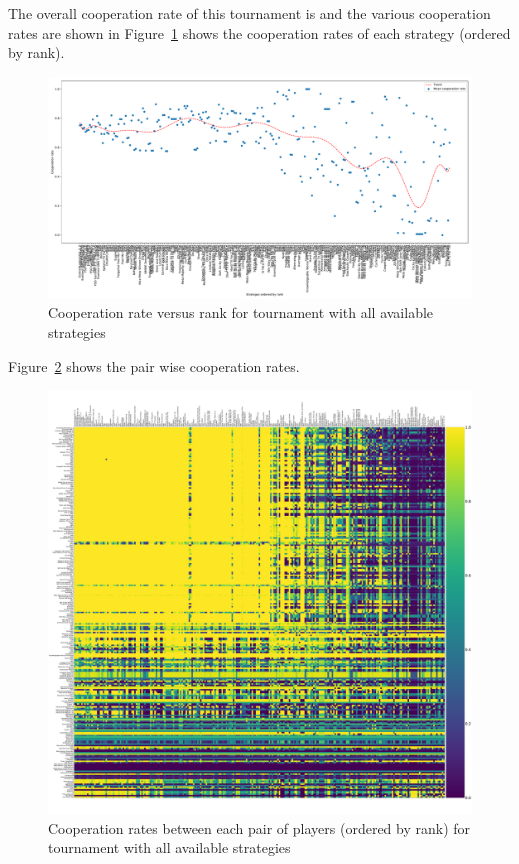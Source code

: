 \documentclass{article}
\begin{document}
The overall cooperation rate of this tournament is
and the various
cooperation rates are shown in
Figure~\ref{fig:full_tournament_cooperation_rate_versus_rank} shows the
cooperation rates of each strategy (ordered by rank).

\begin{figure}[!hbtp]
    \centering
    \includegraphics[width=.8\textwidth]{assets/full_tournament_cooperation_rate_versus_rank.pdf}
    \caption{Cooperation rate versus rank for tournament with all available
    strategies}
    \label{fig:full_tournament_cooperation_rate_versus_rank}
\end{figure}


Figure~\ref{fig:full_tournament_cooperation_rates} shows the pair wise
cooperation rates.

\begin{figure}[!hbtp]
    \centering
    \includegraphics[width=.8\textwidth]{assets/full_tournament_cooperation_rates}
    \caption{Cooperation rates between each pair of players (ordered by rank)
    for tournament with all available strategies}
    \label{fig:full_tournament_cooperation_rates}
\end{figure}
\end{document}
